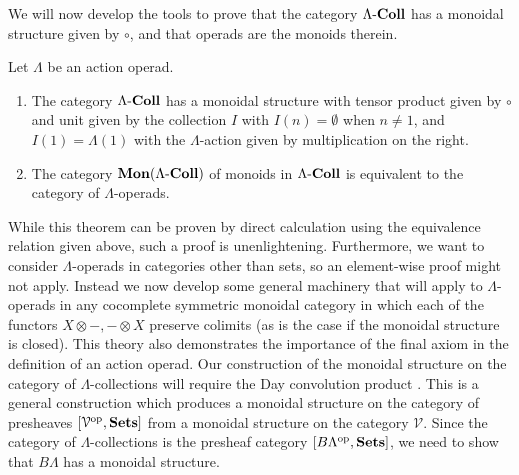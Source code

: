 We will now develop the tools to prove that the category $\Lambda\mathbf{\mbox{-}Coll}$ has a monoidal structure given by $\circ$, and that operads are the monoids therein.

\begin{thm}\label{operad=monoid}
Let $\Lambda$ be an action operad.
  \begin{enumerate}
    \item The category $\Lambda\mathbf{\mbox{-}Coll}$ has a monoidal structure with tensor product given by $\circ$ and unit given by the collection $I$ with $I(n) = \emptyset$ when $n \neq 1$, and $I(1) = \Lambda(1)$ with the $\Lambda$-action given by multiplication on the right.
    \item The category $\mathbf{Mon}(\Lambda\mathbf{\mbox{-}Coll})$ of monoids in $\Lambda\mathbf{\mbox{-}Coll}$ is equivalent to the category of $\Lambda$-operads.
  \end{enumerate}
\end{thm}

While this theorem can be proven by direct calculation using the equivalence relation given above, such a proof is unenlightening. Furthermore, we want to consider $\Lambda$-operads in categories other than sets, so an element-wise proof might not apply. Instead we now develop some general machinery that will apply to $\Lambda$-operads in any cocomplete symmetric monoidal category in which each of  the functors $X \otimes -, - \otimes X$ preserve colimits (as is the case if the monoidal structure is closed). This theory also demonstrates the importance of the final axiom in the definition of an action operad. Our construction of the monoidal structure on the category of $\Lambda$-collections will require the Day convolution product \cite{day-thesis}. This is a general construction which produces a monoidal structure on the category of presheaves $[\mathcal{V}^{\textrm{op}}, \mathbf{Sets}]$ from a monoidal structure on the category $\mathcal{V}$. Since the category of $\Lambda$-collections is the presheaf category $[B\Lambda^{\textrm{op}}, \mathbf{Sets}]$, we need to show that $B\Lambda$ has a monoidal structure.

